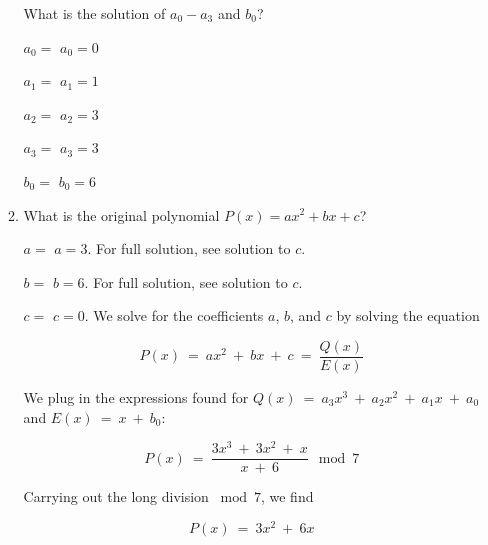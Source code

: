\documentclass[11pt,preview]{standalone} %
\begin{document}
\begin{enumerate}
\begin{enumerate}
    What is the solution of $a_0-a_3$ and $b_0$?
    \begin{Freeform}{0}
    $a_0 = $
    \Solution $a_0 = 0$
    \end{Freeform}
    \begin{Freeform}{1}
    $a_1 = $
    \Solution $a_1 = 1$
    \end{Freeform}
    \begin{Freeform}{3}
    $a_2 = $
    \Solution $a_2 = 3$
    \end{Freeform}
    \begin{Freeform}{3}
    $a_3 = $
    \Solution $a_3 = 3$
    \end{Freeform}
    \begin{Freeform}{6}
    $b_0 = $
    \Solution $b_0 = 6$
    \end{Freeform}
    \item What is the original polynomial $P(x)=ax^2+bx+c$?
    \begin{Freeform}{3}
      $a = $
      \Solution $a = 3$. For full solution, see solution to $c$.
    \end{Freeform}
    \begin{Freeform}{6}
      $b = $
      \Solution $b = 6$. For full solution, see solution to $c$.
    \end{Freeform}
    \begin{Freeform}{0}
      $c = $
      \Solution $c = 0$. We solve for the coefficients $a$, $b$, and $c$ by solving the equation

      $$P(x)\ =\ a x^2\ +\ b x\ +\ c\ =\ \frac{Q(x)}{E(x)}$$

      We plug in the expressions found for $Q(x)\ =\ a_3 x^3\ +\ a_2 x^2\ +\ a_1 x\ +\ a_0$ and $E(x)\ =\ x\ +\ b_0$:

      $$P(x)\ =\ \frac{3 x^3\ +\ 3 x^2\ +\ x}{x\ +\ 6}\ \bmod 7$$

      Carrying out the long division $\bmod 7$, we find

      $$P(x)\ =\ 3 x^2\ +\ 6 x$$


\end{Freeform}
\end{enumerate}
\end{enumerate}
\end{document}
